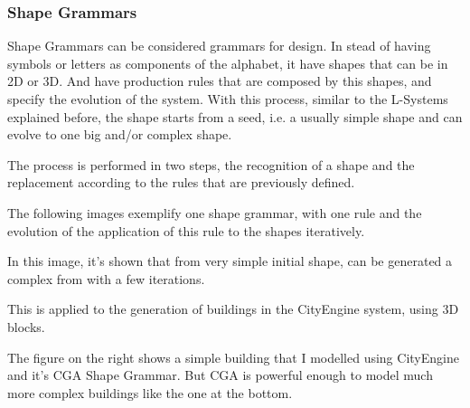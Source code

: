 
\subsubsection{Shape Grammars} %
\label{ssub:shape_grammars}


Shape Grammars can be considered grammars for design. In stead of having symbols or letters as components of the alphabet, it have shapes that can be in 2D or 3D. And have production rules that are composed by this shapes, and specify the evolution of the system. With this process, similar to the L-Systems explained before, the shape starts from a seed, i.e. a usually simple shape and can evolve to one big and/or complex shape.

The process is performed in two steps, the recognition of a shape and the replacement according to the rules that are previously defined. 

The following images exemplify one shape grammar, with one rule and the evolution of the application of this rule to the shapes iteratively.



In this image, it's shown that from very simple initial shape, can be generated a complex from with a few iterations.




This is applied to the generation of buildings in the CityEngine system, using 3D blocks.





The figure on the right shows a simple building that I modelled using CityEngine and it's CGA Shape Grammar. But CGA is powerful enough to model much more complex buildings like the one at the bottom.

 













